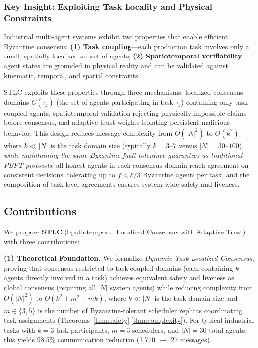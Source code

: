 \documentclass[lettersize,journal]{IEEEtran}
\begin{document}
\subsubsection{Key Insight: Exploiting Task Locality and Physical Constraints}

Industrial multi-agent systems exhibit two properties that enable efficient Byzantine consensus: 
\textbf{(1) Task coupling}—each production task involves only a small, spatially localized subset of agents; 
\textbf{(2) Spatiotemporal verifiability}—agent states are grounded in physical reality and can be validated against kinematic, temporal, and spatial constraints.

STLC exploits these properties through three mechanisms: localized consensus 
domains $C(\tau_j)$ (the set of agents participating in task $\tau_j$) containing only task-coupled agents, spatiotemporal validation rejecting physically impossible claims before consensus, and adaptive trust weights isolating persistent malicious behavior. This design reduces message complexity from $O(|N|^2)$ to $O(k^2)$ where $k \ll |N|$ is the task domain size
(typically $k=3$--$7$ versus $|N|=30$--$100$), \textit{while maintaining the same Byzantine fault tolerance guarantees as traditional PBFT protocols}: all honest agents in each consensus domain reach agreement on consistent decisions, tolerating up to $f < k/3$ Byzantine agents per task, and the composition of task-level agreements ensures system-wide safety and liveness.

\subsection{Contributions}
We propose \textbf{STLC} (Spatiotemporal Localized Consensus with Adaptive Trust) with three contributions:

\textbf{(1) Theoretical Foundation.} We formalize \textit{Dynamic Task-Localized Consensus}, proving that consensus 
restricted to task-coupled domains (each containing $k$ agents directly involved 
in a task) achieves equivalent safety and liveness as global consensus (requiring 
all $|N|$ system agents) while reducing complexity from $O(|N|^2)$ to 
$O(k^2 + m^2 + mk)$, where $k \ll |N|$ is the task domain size and $m \in \{3,5\}$ 
is the number of Byzantine-tolerant scheduler replicas coordinating task 
assignments (Theorems~\ref{thm:safety}-\ref{thm:complexity}). 
For typical industrial tasks with $k=3$ task participants, $m=3$ schedulers, and 
$|N|=30$ total agents, this yields 98.5\% communication reduction (1,770 $\to$ 27 
messages).
\end{document}
